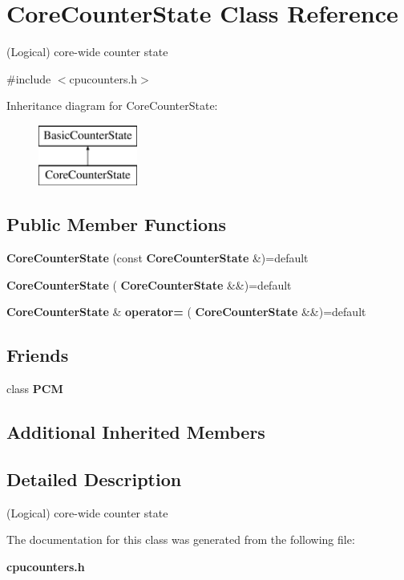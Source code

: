 \section{Core\+Counter\+State Class Reference}
\label{classCoreCounterState}


(Logical) core-\/wide counter state  




{\ttfamily \#include $<$cpucounters.\+h$>$}

Inheritance diagram for Core\+Counter\+State\+:\begin{figure}[H]
\begin{center}
\leavevmode
\includegraphics[height=2.000000cm]{classCoreCounterState}
\end{center}
\end{figure}
\subsection*{Public Member Functions}
\begin{DoxyCompactItemize}
\item 
\mbox{\label{classCoreCounterState_ad225040889c19ee0e78db5b476421e47}} 
{\bfseries Core\+Counter\+State} (const \textbf{ Core\+Counter\+State} \&)=default
\item 
\mbox{\label{classCoreCounterState_a6ac2e66afbbc49ecb8ccea52102bd98a}} 
{\bfseries Core\+Counter\+State} (\textbf{ Core\+Counter\+State} \&\&)=default
\item 
\mbox{\label{classCoreCounterState_af5ecb389b54058ececbe2750b6fd3e2e}} 
\textbf{ Core\+Counter\+State} \& {\bfseries operator=} (\textbf{ Core\+Counter\+State} \&\&)=default
\end{DoxyCompactItemize}
\subsection*{Friends}
\begin{DoxyCompactItemize}
\item 
\mbox{\label{classCoreCounterState_ab5f56d2e95ba3daf52c17b8a1d356d64}} 
class {\bfseries P\+CM}
\end{DoxyCompactItemize}
\subsection*{Additional Inherited Members}


\subsection{Detailed Description}
(Logical) core-\/wide counter state 

The documentation for this class was generated from the following file\+:\begin{DoxyCompactItemize}
\item 
\textbf{ cpucounters.\+h}\end{DoxyCompactItemize}
